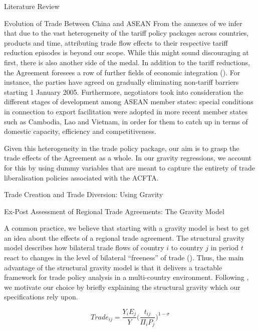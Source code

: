 \begin{section}{Literature Review}
\begin{subsection}{Evolution of Trade Between China and ASEAN}
From the annexes of \cite{asean_2002_4} we infer that due to the vast heterogeneity of the tariff policy packages across countries, products and time, attributing trade flow effects to their respective tariff reduction episodes is beyond our scope. While this might sound discouraging at first, there is also another side of the medal. In addition to the tariff reductions, the Agreement foresees a row of further fields of economic integration (\cite{asean_2002_1}). For instance, the parties have agreed on gradually eliminating non-tariff barriers starting 1 January 2005. Furthermore, negotiators took into consideration the different stages of development among ASEAN member states: special conditions in connection to export facilitation were adopted in more recent member states such as Cambodia, Lao and Vietnam, in order for them to catch up in terms of domestic capacity, efficiency and competitiveness.

Given this heterogeneity in the trade policy package, our aim is to grasp the trade effects of the Agreement as a whole. In our gravity regressions, we account for this by using dummy variables that are meant to capture the entirety of trade liberalisation policies associated with the ACFTA.

\end{subsection}

\begin{subsection}{Trade Creation and Trade Diversion: Using Gravity}

\begin{subsubsection}{Ex-Post Assessment of Regional Trade Agreements: The Gravity Model}

A common practice, we believe that starting with a gravity model is best to get an idea about the effects of a regional trade agreement. The structural gravity model describes how bilateral trade flows of country $i$ to country $j$ in period $t$ react to changes in the level of bilateral “freeness” of trade (\cite{mvzj_2019}). Thus, the main advantage of the structural gravity model is that it delivers a tractable framework for trade policy analysis in a multi-country environment. Following \cite{ypl_2016}, we motivate our choice by briefly explaining the structural gravity which our specifications rely upon. 

\begin{equation}\label{eq_1}
    Trade_{ij}=\frac{Y_{i}E_{j}}{Y}\Big(\frac{t_{ij}}{\Pi_{i}P_{j}}\Big)^{1-\sigma}
\end{equation}


\end{subsubsection}
\end{subsection}
\end{section}
